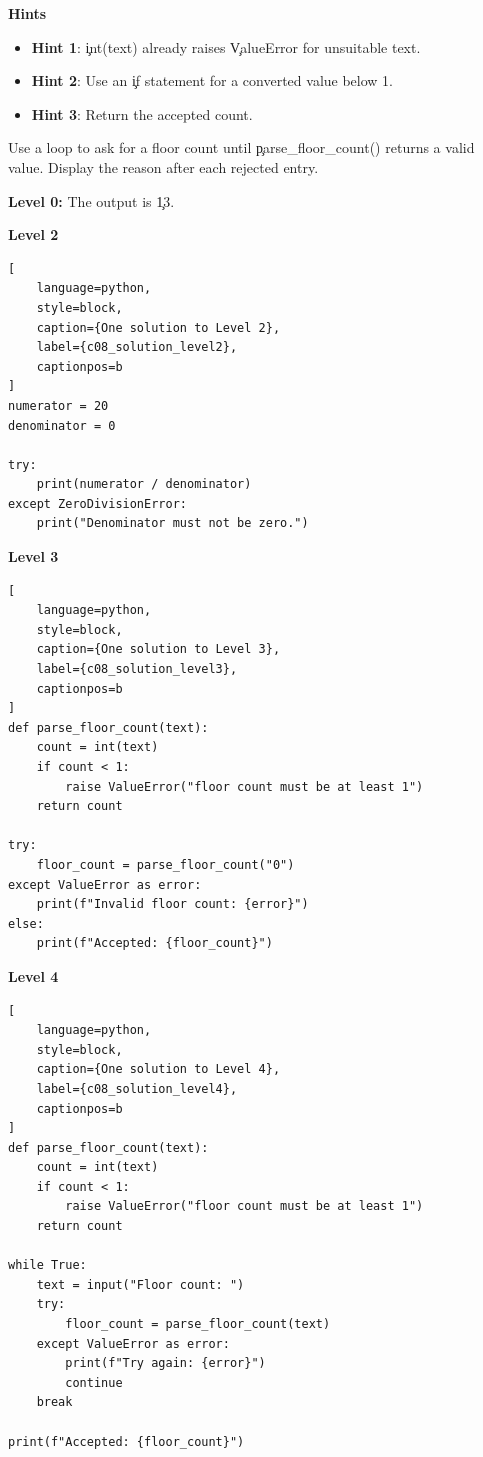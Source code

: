 \textbf{Hints}
\begin{itemize}
    \item \textbf{Hint 1}: \c{int(text)} already raises \c{ValueError} for unsuitable text.
    \item \textbf{Hint 2}: Use an \c{if} statement for a converted value below 1.
    \item \textbf{Hint 3}: Return the accepted count.
\end{itemize}


Use a loop to ask for a floor count until \c{parse_floor_count()} returns a
valid value. Display the reason after each rejected entry.


\textbf{Level 0:} The output is \c{13}.

\textbf{Level 2}

\begin{lstlisting}[
    language=python,
    style=block,
    caption={One solution to Level 2},
    label={c08_solution_level2},
    captionpos=b
]
numerator = 20
denominator = 0

try:
    print(numerator / denominator)
except ZeroDivisionError:
    print("Denominator must not be zero.")
\end{lstlisting}

\textbf{Level 3}

\begin{lstlisting}[
    language=python,
    style=block,
    caption={One solution to Level 3},
    label={c08_solution_level3},
    captionpos=b
]
def parse_floor_count(text):
    count = int(text)
    if count < 1:
        raise ValueError("floor count must be at least 1")
    return count

try:
    floor_count = parse_floor_count("0")
except ValueError as error:
    print(f"Invalid floor count: {error}")
else:
    print(f"Accepted: {floor_count}")
\end{lstlisting}

\textbf{Level 4}

\begin{lstlisting}[
    language=python,
    style=block,
    caption={One solution to Level 4},
    label={c08_solution_level4},
    captionpos=b
]
def parse_floor_count(text):
    count = int(text)
    if count < 1:
        raise ValueError("floor count must be at least 1")
    return count

while True:
    text = input("Floor count: ")
    try:
        floor_count = parse_floor_count(text)
    except ValueError as error:
        print(f"Try again: {error}")
        continue
    break

print(f"Accepted: {floor_count}")
\end{lstlisting}

